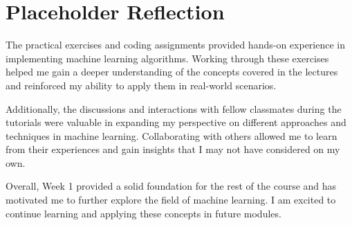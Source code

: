 \section{Placeholder Reflection}

The practical exercises and coding assignments provided hands-on experience in implementing machine learning algorithms. Working through these exercises helped me gain a deeper understanding of the concepts covered in the lectures and reinforced my ability to apply them in real-world scenarios.

Additionally, the discussions and interactions with fellow classmates during the tutorials were valuable in expanding my perspective on different approaches and techniques in machine learning. Collaborating with others allowed me to learn from their experiences and gain insights that I may not have considered on my own.

Overall, Week 1 provided a solid foundation for the rest of the course and has motivated me to further explore the field of machine learning. I am excited to continue learning and applying these concepts in future modules.